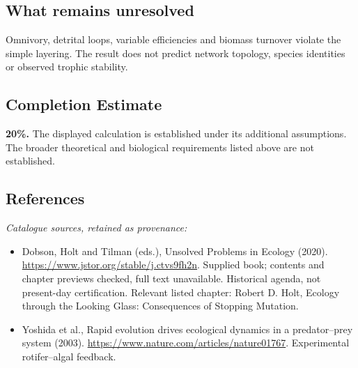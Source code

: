\documentclass[11pt]{article}
\begin{document}
\subsection{What remains unresolved}
Omnivory, detrital loops, variable efficiencies and biomass turnover violate the simple layering. The result does not predict network topology, species identities or observed trophic stability.
\subsection{Completion Estimate}
\textbf{20\%.} The displayed calculation is established under its additional assumptions. The broader theoretical and biological requirements listed above are not established.
\subsection{References}
\noindent\emph{Catalogue sources, retained as provenance:}
\begin{itemize}
\item Dobson, Holt and Tilman (eds.), Unsolved Problems in Ecology (2020). \url{https://www.jstor.org/stable/j.ctvs9fh2n}. Supplied book; contents and chapter previews checked, full text unavailable. Historical agenda, not present-day certification. Relevant listed chapter: Robert D. Holt, Ecology through the Looking Glass: Consequences of Stopping Mutation.
\item Yoshida et al., Rapid evolution drives ecological dynamics in a predator--prey system (2003). \url{https://www.nature.com/articles/nature01767}. Experimental rotifer--algal feedback.
\end{itemize}
\clearpage


\appendix
\end{document}
